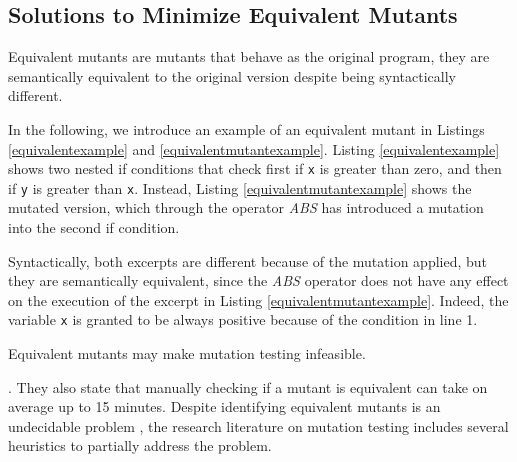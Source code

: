 
\subsection{Solutions to Minimize Equivalent Mutants}
\label{sec:opt:equivalent}

Equivalent mutants are mutants that behave as the original program, they are semantically equivalent to the original version despite being syntactically different. 

In the following, we introduce an example of an equivalent mutant in Listings \ref{equivalentexample} and \ref{equivalentmutantexample}. Listing \ref{equivalentexample} shows two nested if conditions that check first if \texttt{x} is greater than zero, and then if \texttt{y} is greater than \texttt{x}. Instead, Listing \ref{equivalentmutantexample} shows the mutated version, which through the operator \textit{ABS} has introduced a mutation into the second if condition.



Syntactically, both excerpts are different because of the mutation applied, but they are semantically equivalent, since the \textit{ABS} operator does not have any effect on the execution of the excerpt in Listing \ref{equivalentmutantexample}. Indeed, the variable \texttt{x} is granted to be always positive because of the condition in line 1.

Equivalent mutants may make mutation testing infeasible.  

. They also state that manually checking if a mutant is equivalent can take on average up to 15 minutes.
 Despite identifying equivalent mutants is an undecidable problem \cite{madeyski2013overcoming}, the research literature on mutation testing includes several heuristics to partially address the problem. 

